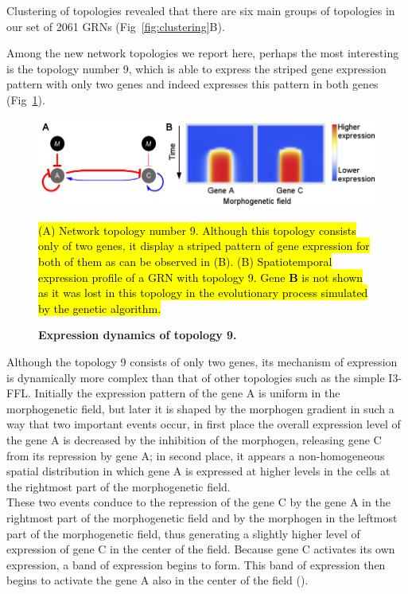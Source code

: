 \documentclass[10pt,letterpaper]{article}
\newcommand{\hil}[1]{\hl{#1}} %
\begin{document}
Clustering of topologies revealed that there are six main groups of topologies
in our set of 2061 GRNs (Fig~\ref{fig:clustering}B).

Among the new network topologies we report here, perhaps the most interesting
is the topology number 9, which is able to express the striped gene expression
pattern with only two genes and indeed expresses this pattern in both genes
(Fig~\ref{fig:topol9}).

\begin{figure}[!h]
 \includegraphics[width=\textwidth]{figures/results/Fig8}
 \caption{\bf Expression dynamics of topology 9.}
 \hil{(A) Network topology number 9. Although this topology consists only of two
 genes, it display a striped pattern of gene expression for both of them as
 can be observed in (B). (B) Spatiotemporal expression profile of a GRN
 with topology 9. Gene \textbf{B} is not shown as it was lost in this topology
 in the evolutionary process simulated by the genetic algorithm.}
 \label{fig:topol9}
\end{figure}

Although the topology 9 consists of only two genes, its mechanism of expression
is dynamically more complex than that of other topologies such as the simple
I3-FFL. Initially the expression pattern of the gene A is uniform in the
morphogenetic field, but later it is shaped by the morphogen gradient in such a
way that two important events occur, in first place the overall expression
level of the gene A is decreased by the inhibition of the morphogen, releasing
gene C from its repression by gene A; in second place, it appears a
non-homogeneous spatial distribution in which gene A is expressed at higher
levels in the cells at the rightmost part of the morphogenetic field.\\

These two events conduce to the repression of the gene C by the gene A in the
rightmost part of the morphogenetic field and by the morphogen in the leftmost
part of the morphogenetic field, thus generating a slightly higher level of
expression of gene C in the center of the field. Because gene C activates its
own expression, a band of expression begins to form. This band of expression
then begins to activate the gene A also in the center of the field
().
\end{document}
